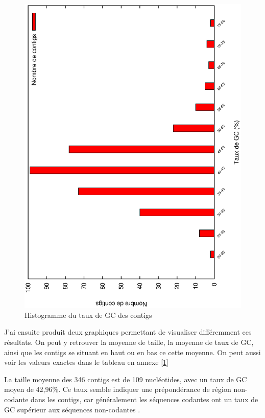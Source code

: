 \documentclass[10.9pt]{article} %
\begin{document}
\begin{figure}[p]
\includegraphics[scale=0.6,angle=270]{question_1/histogramme_taux.eps}
\caption{Histogramme du taux de GC des contigs}
\end{figure}

J'ai ensuite produit deux graphiques permettant de visualiser différemment ces résultats. On peut
y retrouver la moyenne de taille, la moyenne de taux de GC, ainsi que les contigs se situant en
haut ou en bas ce cette moyenne. On peut aussi voir les valeurs exactes dans le tableau en annexe \ref{1}

La taille moyenne des 346 contigs est de 109 nucléotides, avec un taux de GC moyen de 42,96\%. Ce taux semble
indiquer une prépondérance de région non-codante dans les contigs, car généralement les séquences codantes ont
un taux de GC supérieur aux séquences non-codantes \cite{Wikipedia-GC}.
\end{document}
